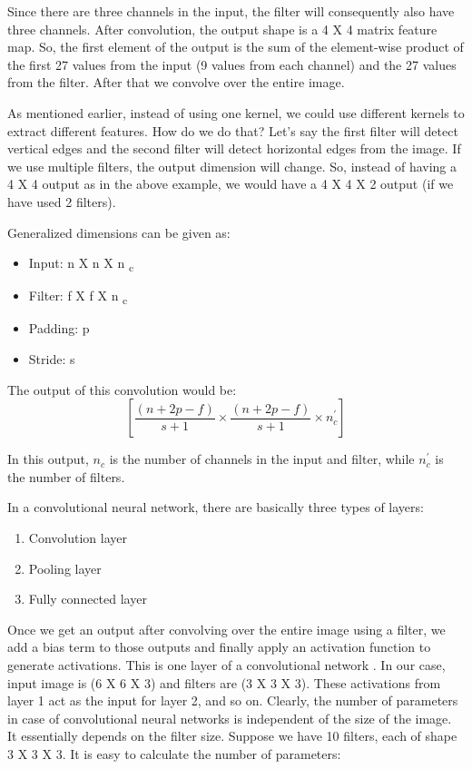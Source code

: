 Since there are three channels in the input, the filter will consequently also have three channels. After convolution, the output shape is a 4 X 4 matrix feature map. So, the first element of the output is the sum of the element-wise product of the first 27 values from the input (9 values from each channel) and the 27 values from the filter. After that we convolve over the entire image.
\par
As mentioned earlier, instead of using one kernel, we could use different kernels to extract different features. How do we do that? Let’s say the first filter will detect vertical edges and the second filter will detect horizontal edges from the image. If we use multiple filters, the output dimension will change. So, instead of having a 4 X 4 output as in the above example, we would have a 4 X 4 X 2 output (if we have used 2 filters).
\par
Generalized dimensions can be given as:
\begin{itemize}
  \item Input: n X n X n \textsubscript{c}
  \item Filter: f X f X n \textsubscript{c}
  \item Padding: p
  \item Stride: s
\end{itemize}

The output of this convolution would be:
$$ [\frac{(n+2p-f)}{s+1} \times \frac{(n+2p-f)}{s+1} \times n_{c}^\prime] $$

In this output, $n_c$ is the number of channels in the input and filter, while $ n_c^\prime $ is the number of filters.

In a convolutional neural network, there are basically three types of layers:

\begin{enumerate}
  \item Convolution layer
  \item Pooling layer
  \item Fully connected layer
\end{enumerate}

Once we get an output after convolving over the entire image using a filter, we add a bias term to those outputs and finally apply an activation function to generate activations. This is one layer of a convolutional network . In our case, input image is (6 X 6 X 3) and filters are (3 X 3 X 3). These activations from layer 1 act as the input for layer 2, and so on. Clearly, the number of parameters in case of convolutional neural networks is independent of the size of the image. It essentially depends on the filter size. Suppose we have 10 filters, each of shape 3 X 3 X 3. It is easy to calculate the number of parameters:

